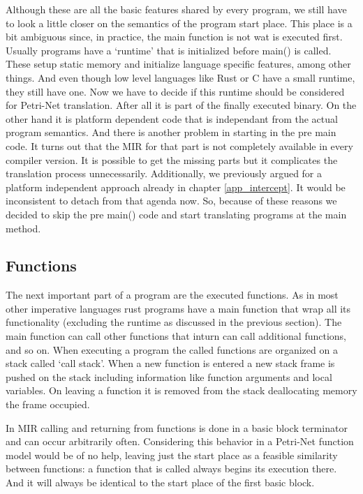 Although these are all the basic features shared by every program, we still have to look a little closer on the semantics of the program start place.
This place is a bit ambiguous since, in practice, the main function is not wat is executed first.
Usually programs have a `runtime' that is initialized before main() is called.
These setup static memory and initialize language specific features, among other things.
And even though low level languages like Rust or C have a small runtime, they still have one.
Now we have to decide if this runtime should be considered for Petri-Net translation.
After all it is part of the finally executed binary.
On the other hand it is platform dependent code that is independant from the actual program semantics.
And there is another problem in starting in the pre main code.
It turns out that the MIR for that part is not completely available in every compiler version.
It is possible to get the missing parts but it complicates the translation process unnecessarily.
Additionally, we previously argued for a platform independent approach already in chapter \ref{app_intercept}.
It would be inconsistent to detach from that agenda now.
So, because of these reasons we decided to skip the pre main() code and start translating programs at the main method.

\subsection{Functions}
The next important part of a program are the executed functions.
As in most other imperative languages rust programs have a main function that wrap all its functionality (excluding the runtime as discussed in the previous section).
The main function can call other functions that inturn can call additional functions, and so on.
When executing a program the called functions are organized on a stack called `call stack'.
When a new function is entered a new stack frame is pushed on the stack including information like function arguments and local variables.
On leaving a function it is removed from the stack deallocating memory the frame occupied.

In MIR calling and returning from functions is done in a basic block terminator and can occur arbitrarily often.
Considering this behavior in a Petri-Net function model would be of no help, leaving just the start place as a feasible similarity between functions:
a function that is called always begins its execution there.
And it will always be identical to the start place of the first basic block.

